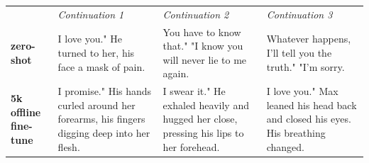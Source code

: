 \begin{table}[t]
\begin{center}
\begin{tabular}{|p{2cm}|p{4cm}|p{4cm}|p{4cm}|}
{}
\\
\hline
&
\textit{Continuation 1}
&
\textit{Continuation 2}
&
\textit{Continuation 3}
\\
\hline
\textbf{zero-shot}
&
I love you."
\newline\newline
He turned to her, his face a mask of pain.
&
You have to know that."
\newline\newline
"I know you will never lie to me again.
&
Whatever happens, I'll tell you the truth."
\newline\newline
"I'm sorry.
\\
\hline
\textbf{5k offline fine-tune}
&
I promise."
\newline\newline
His hands curled around her forearms, his fingers digging deep into her flesh.
&
I swear it."
\newline\newline
He exhaled heavily and hugged her close, pressing his lips to her forehead.
&
I love you."
\newline\newline
Max leaned his head back and closed his eyes. His breathing changed.
\\
\hline



\end{tabular}
\end{center}
\end{table}
